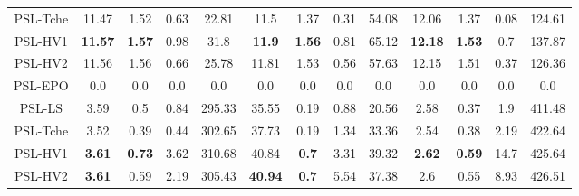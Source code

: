 \begin{table}[]
\begin{tabular}{ccccccccccccc}
PSL-Tche&        11.47         &              1.52         &             0.63    &        22.81 &      11.5          &              1.37         &             0.31    &        54.08&     12.06         &              1.37         &             0.08    &        124.61\\
PSL-HV1 &        \textbf{11.57}&              \textbf{1.57}&             0.98    &        31.8  &      \textbf{11.9} &              \textbf{1.56}&             0.81    &        65.12&     \textbf{12.18}&              \textbf{1.53}&             0.7     &        137.87\\
PSL-HV2 &        11.56         &              1.56         &             0.66    &        25.78 &      11.81         &              1.53         &             0.56    &        57.63&     12.15         &              1.51         &             0.37    &        126.36\\
PSL-EPO &        0.0           &              0.0          &             0.0     &        0.0   &      0.0           &              0.0          &             0.0     &        0.0  &     0.0           &              0.0          &             0.0     &        0.0\\
PSL-LS  &        3.59          &              0.5          &             0.84    &        295.33&      35.55         &              0.19         &             0.88    &        20.56&     2.58          &              0.37         &             1.9     &        411.48\\
PSL-Tche&        3.52          &              0.39         &             0.44    &        302.65&      37.73         &              0.19         &             1.34    &        33.36&     2.54          &              0.38         &             2.19    &        422.64\\
PSL-HV1 &        \textbf{3.61} &              \textbf{0.73}&             3.62    &        310.68&      40.84         &              \textbf{0.7} &             3.31    &        39.32&     \textbf{2.62} &              \textbf{0.59}&             14.7    &        425.64\\
PSL-HV2 &        \textbf{3.61} &              0.59         &             2.19    &        305.43&      \textbf{40.94}&              \textbf{0.7} &             5.54    &        37.38&     2.6           &              0.55         &             8.93    &        426.51\\

\end{tabular}
\end{table}

